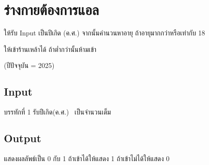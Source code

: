 \documentclass{article}
\begin{document}
\section*{ร่างกายต้องการแอล}

{ให้รับ Input เป็นปีเกิด (ค.ศ.) จากนั้นคำนวนหาอายุ ถ้าอายุมากกว่าหรือเท่ากับ 18

ให้เข้าร้านเหล้าได้ ถ้าต่ำกว่านั้นห้ามเข้า}{(ปีปัจจุบัน = 2025)}\\



\subsection*{Input}
{บรรทักที่ 1 รับปีเกิด(ค.ศ.)~ เป็นจำนวนเต็ม}\\



\subsection*{Output}
{แสดงผลลัพธ์เป็น 0 กับ 1 ถ้าเข้าได้ให้แสดง 1 ถ้าเข้าไม่ได้ให้แสดง 0}\\
\end{document}
